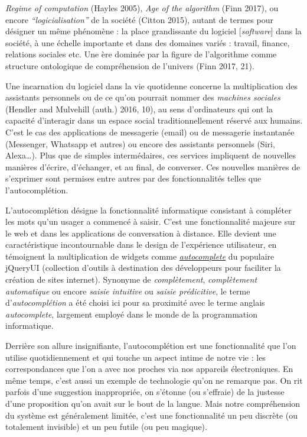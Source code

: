 \documentclass[]{article}
\begin{document}
\emph{Regime of computation} (Hayles 2005), \emph{Age of the algorithm}
(Finn 2017), ou encore \emph{``logicialisation''} de la société (Citton
2015), autant de termes pour désigner un même phénomène : la place
grandissante du logiciel {[}\emph{software}{]} dans la société, à une
échelle importante et dans des domaines variés : travail, finance,
relations sociales etc. Une ère dominée par la figure de l'algorithme
comme structure ontologique de compréhension de l'univers (Finn 2017,
21).

Une incarnation du logiciel dans la vie quotidenne concerne la
multiplication des assistants personnels ou de ce qu'on pourrait nommer
des \emph{machines sociales} (Hendler and Mulvehill (auth.) 2016, 10),
au sens d'ordinateurs qui ont la capacité d'interagir dans un espace
social traditionnellement réservé aux humains. C'est le cas des
applications de messagerie (email) ou de messagerie instantanée
(Messenger, Whatsapp et autres) ou encore des assistants personnels
(Siri, Alexa\ldots{}). Plus que de simples intermédaires, ces services
impliquent de nouvelles manières d'écrire, d'échanger, et au final, de
converser. Ces nouvelles manières de s'exprimer sont permises entre
autres par des fonctionnalités telles que l'autocomplétion.

L'autocomplétion désigne la fonctionnalité informatique consistant à
compléter les mots qu'un usager a commencé à saisir. C'est une
fonctionnalité majeure sur le web et dans les applications de
conversation à distance. Elle devient une caractéristique incontournable
dans le design de l'expérience utilisateur, en témoignent la
multiplication de widgets comme
\href{http://jqueryui.com/}{\emph{autocomplete}} du populaire jQueryUI
(collection d'outils à destination des développeurs pour faciliter la
création de sites internet). Synonyme de \emph{complètement},
\emph{complètement automatique} ou encore \emph{saisie intuitive} ou
\emph{saisie prédicitive}, le terme d'\emph{autocomplétion} a été choisi
ici pour sa proximité avec le terme anglais \emph{autocomplete},
largement employé dans le monde de la programmation informatique.

Derrière son allure insignifiante, l'autocomplétion est une
fonctionnalité que l'on utilise quotidiennement et qui touche un aspect
intime de notre vie : les correspondances que l'on a avec nos proches
via nos appareils électroniques. En même temps, c'est aussi un exemple
de technologie qu'on ne remarque pas. On rit parfois d'une suggestion
inappropriée, on s'étonne (ou s'effraie) de la justesse d'une
proposition qu'on avait sur le bout de la langue. Mais notre
compréhension du système est généralement limitée, c'est une
fonctionnalité un peu discrète (ou totalement invisible) et un peu
futile (ou peu magique).
\end{document}

